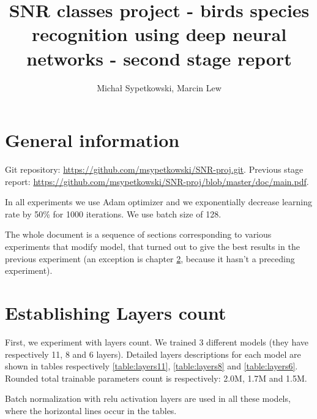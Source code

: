 \documentclass[a4paper]{article}
\begin{document}
\title{SNR classes project - birds species recognition using deep neural networks
- second stage report}

\author{Michał Sypetkowski, Marcin Lew}
\twocolumn
\maketitle


\section{General information}
Git repository:\newline
\url{https://github.com/msypetkowski/SNR-proj.git}.\newline
Previous stage report: \newline
\url{https://github.com/msypetkowski/SNR-proj/blob/master/doc/main.pdf}.

In all experiments we use Adam optimizer and we exponentially
decrease learning rate by 50\% for 1000 iterations.
We use batch size of 128.

The whole document is a sequence of sections corresponding to various experiments that modify model,
that turned out to give the best results in the previous experiment
(an exception is chapter \ref{expLayer}, because it hasn't a preceding experiment).

\section{Establishing Layers count}
\label{expLayer}

First, we experiment with layers count.
    We trained 3 different models (they have respectively 11, 8 and 6 layers).
Detailed layers descriptions for each model are shown in tables respectively
\ref{table:layers11},
\ref{table:layers8} and
\ref{table:layers6}.
Rounded total trainable parameters count is respectively: 2.0M, 1.7M  and 1.5M.

Batch normalization with relu activation layers are used in all these models,
where the horizontal lines occur in the tables.
\end{document}
